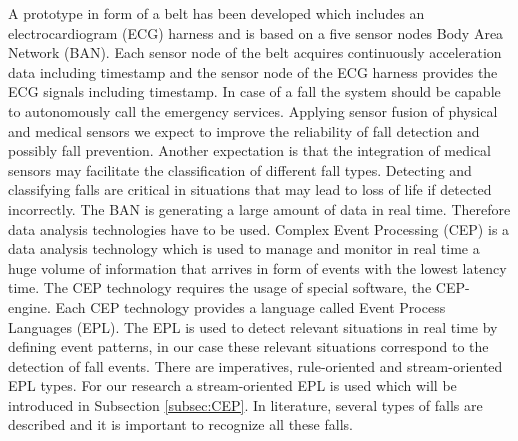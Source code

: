 \documentclass[10pt,journal,compsoc]{IEEEtran}
\begin{document}
A prototype in form of a belt has been developed which includes an electrocardiogram (ECG) harness and is based on a five sensor nodes Body Area Network (BAN). Each sensor node of the belt acquires continuously acceleration data including timestamp and the sensor node of the ECG harness provides the ECG signals including timestamp. In case of a fall the system should be capable to autonomously call the emergency services. Applying sensor fusion of physical and medical sensors we expect to improve the reliability of fall detection and possibly fall prevention. Another expectation is that the integration of medical sensors may facilitate the classification of different fall types. Detecting and classifying falls are critical in situations that may lead to loss of life if detected incorrectly. The BAN is generating a large amount of data in real time. Therefore data analysis technologies have to be used. Complex Event Processing (CEP) \cite{Esper:2016} is a data analysis technology which is used to manage and monitor in real time a huge volume of information that arrives in form of events with the lowest latency time. The CEP technology requires the usage of special software, the CEP-engine. Each CEP technology provides a language called Event Process Languages (EPL). The EPL is used to detect relevant situations in real time by defining event patterns, in our case these relevant situations correspond to the detection of fall events. There are imperatives, rule-oriented and stream-oriented EPL types. For our research a stream-oriented EPL is used which will be introduced in Subsection \ref{subsec:CEP}.  In literature, several types of falls are described and it is important to recognize all these falls. 
\end{document}
